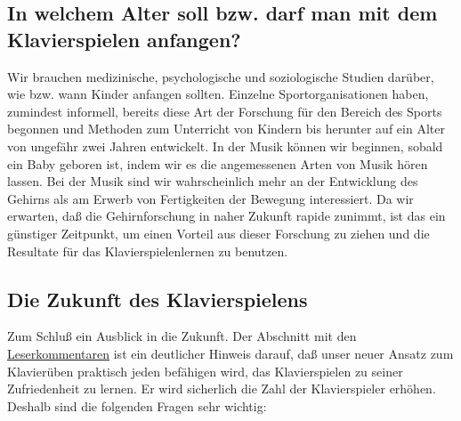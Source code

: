\subsection{In welchem Alter soll bzw. darf man mit dem Klavierspielen anfangen?}\hypertarget{c1iv6g}{}

Wir brauchen medizinische, psychologische und soziologische Studien darüber, wie bzw. wann Kinder anfangen sollten.
Einzelne Sportorganisationen haben, zumindest informell, bereits diese Art der Forschung für den Bereich des Sports begonnen und Methoden zum Unterricht von Kindern bis herunter auf ein Alter von ungefähr zwei Jahren entwickelt.
In der Musik können wir beginnen, sobald ein Baby geboren ist, indem wir es die angemessenen Arten von Musik hören lassen.
Bei der Musik sind wir wahrscheinlich mehr an der Entwicklung des Gehirns als am Erwerb von Fertigkeiten der Bewegung interessiert.
Da wir erwarten, daß die Gehirnforschung in naher Zukunft rapide zunimmt, ist das ein günstiger Zeitpunkt, um einen Vorteil aus dieser Forschung zu ziehen und die Resultate für das Klavierspielenlernen zu benutzen.


\subsection{Die Zukunft des Klavierspielens}\hypertarget{c1iv6h}{}

Zum Schluß ein Ausblick in die Zukunft.
Der Abschnitt mit den \hyperlink{testimonials}{Leserkommentaren} ist ein deutlicher Hinweis darauf, daß unser neuer Ansatz zum Klavierüben praktisch jeden befähigen wird, das Klavierspielen zu seiner Zufriedenheit zu lernen.
Er wird sicherlich die Zahl der Klavierspieler erhöhen.
Deshalb sind die folgenden Fragen sehr wichtig:


